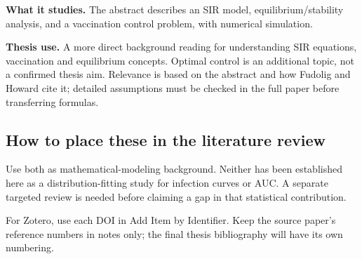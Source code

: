 \documentclass[11pt]{article}
\begin{document}
\textbf{What it studies.} The abstract describes an SIR model, equilibrium/stability analysis, and a vaccination control problem, with numerical simulation.

\textbf{Thesis use.} A more direct background reading for understanding SIR equations, vaccination and equilibrium concepts. Optimal control is an additional topic, not a confirmed thesis aim. Relevance is based on the abstract and how Fudolig and Howard cite it; detailed assumptions must be checked in the full paper before transferring formulas.

\subsection*{How to place these in the literature review}
Use both as mathematical-modeling background. Neither has been established here as a distribution-fitting study for infection curves or AUC. A separate targeted review is needed before claiming a gap in that statistical contribution.

For Zotero, use each DOI in Add Item by Identifier. Keep the source paper's reference numbers in notes only; the final thesis bibliography will have its own numbering.
\end{document}
